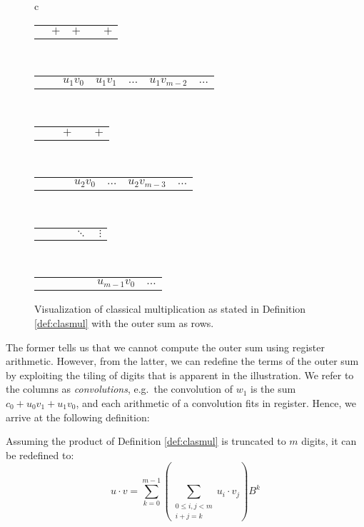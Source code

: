 \begin{figure}
\begin{tabular}{c}
    \begin{tabular}{C{0.8cm}C{0.8cm}C{0.8cm}C{0.5cm}C{0.8cm}}
       & $+$ & $+$ &  & $+$
    \end{tabular}\\[-0.5ex]
    \begin{tabular}{C{0cm}C{0.8cm}C{0.8cm}C{0.8cm}C{0.5cm}C{0.8cm}C{0cm}}
       & & $u_1v_0$ & $u_1v_1$ & $\ldots$ & $u_1v_{m-2}$ & $\ldots$
    \end{tabular}\\[-0.5ex]
    \begin{tabular}{C{0.8cm}C{0.8cm}C{0.8cm}C{0.5cm}C{0.8cm}}
       & & $+$ &  & $+$
    \end{tabular}\\[-0.5ex]
    \begin{tabular}{C{0cm}C{0.8cm}C{0.8cm}C{0.8cm}C{0.5cm}C{0.8cm}C{0cm}}
       & & & $u_2v_0$ & $\ldots$ & $u_2v_{m-3}$ & $\ldots$
    \end{tabular}\\[-0.6ex]
    \begin{tabular}{C{0.8cm}C{0.8cm}C{0.8cm}C{0.5cm}C{0.8cm}}
       & & & $\ddots$ & $\vdots$
    \end{tabular}\\[-0.6ex]
    \begin{tabular}{C{0cm}C{0.8cm}C{0.8cm}C{0.8cm}C{0.5cm}C{0.8cm}C{0cm}}
       & & & & & $u_{m-1}v_0$ & $\ldots$
    \end{tabular}
  \end{tabular}
  \caption{\footnotesize Visualization of classical multiplication as stated in Definition \ref{def:clasmul} with the outer sum as rows.}
  \label{fig:tiledmult}
\end{figure}

The former tells us that we cannot compute the outer sum using register
arithmetic. However, from the latter, we can redefine the terms of the outer sum
by exploiting the tiling of digits that is apparent in the illustration. We
refer to the columns as \textit{convolutions}, e.g.\ the convolution of $w_1$ is
the sum $c_0+u_0v_1+u_1v_0$, and each arithmetic of a convolution fits in
register. Hence, we arrive at the following definition:

\begin{definition}\label{def:clasmultil}
  Assuming the product of Definition \ref{def:clasmul} is truncated to $m$
  digits, it can be redefined to:
\begin{equation}
\label{eq:clasmul}
u \cdot v = \sum_{k=0}^{m-1} \left( \sum_{\substack{0\leq i,j < m\\i+j=k}}u_i\cdot v_j \right)B^{k}
\end{equation}
\end{definition}

